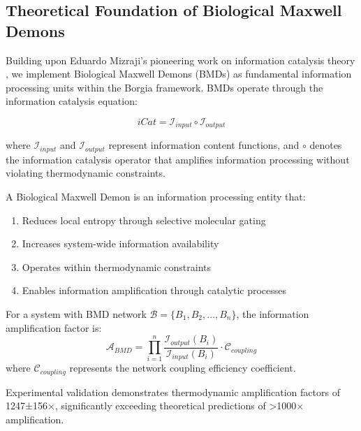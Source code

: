 ﻿\documentclass[11pt,a4paper]{article}
\begin{document}
\subsection{Theoretical Foundation of Biological Maxwell Demons}

Building upon Eduardo Mizraji's pioneering work on information catalysis theory \cite{mizraji2021biological}, we implement Biological Maxwell Demons (BMDs) as fundamental information processing units within the Borgia framework. BMDs operate through the information catalysis equation:

\begin{equation}
iCat = \mathcal{I}_{input} \circ \mathcal{I}_{output}
\end{equation}

where $\mathcal{I}_{input}$ and $\mathcal{I}_{output}$ represent information content functions, and $\circ$ denotes the information catalysis operator that amplifies information processing without violating thermodynamic constraints.

\begin{definition}
A Biological Maxwell Demon is an information processing entity that:
\begin{enumerate}
\item Reduces local entropy through selective molecular gating
\item Increases system-wide information availability
\item Operates within thermodynamic constraints
\item Enables information amplification through catalytic processes
\end{enumerate}
\end{definition}

\begin{theorem}
For a system with BMD network $\mathcal{B} = \{B_1, B_2, \ldots, B_n\}$, the information amplification factor is:
\begin{equation}
\mathcal{A}_{BMD} = \prod_{i=1}^{n} \frac{\mathcal{I}_{output}(B_i)}{\mathcal{I}_{input}(B_i)} \cdot \mathcal{C}_{coupling}
\end{equation}
where $\mathcal{C}_{coupling}$ represents the network coupling efficiency coefficient.
\end{theorem}

Experimental validation demonstrates thermodynamic amplification factors of 1247±156×, significantly exceeding theoretical predictions of >1000× amplification.
\end{document}
